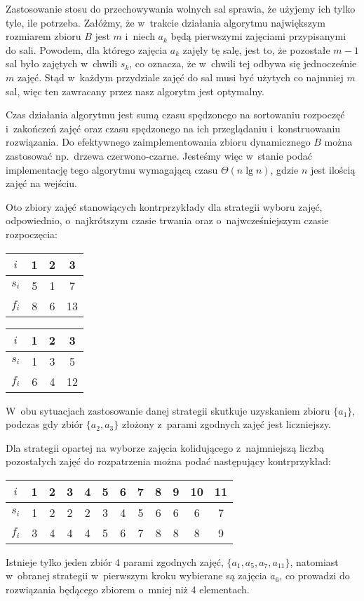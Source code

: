 Zastosowanie stosu do przechowywania wolnych sal sprawia, że użyjemy ich tylko tyle, ile potrzeba.
Załóżmy, że w~trakcie działania algorytmu największym rozmiarem zbioru $B$ jest $m$ i~niech $a_k$ będą pierwszymi zajęciami przypisanymi do  sali.
Powodem, dla którego zajęcia $a_k$ zajęły tę salę, jest to, że pozostałe $m-1$ sal było zajętych w~chwili $s_k$, co oznacza, że w~chwili tej odbywa się jednocześnie $m$ zajęć.
Stąd w~każdym przydziale zajęć do sal musi być użytych co najmniej $m$ sal, więc ten zawracany przez nasz algorytm jest optymalny.

Czas działania algorytmu jest sumą czasu spędzonego na sortowaniu rozpoczęć i~zakończeń zajęć oraz czasu spędzonego na ich przeglądaniu i~konstruowaniu rozwiązania.
Do efektywnego zaimplementowania zbioru dynamicznego $B$ można zastosować np.\ drzewa czerwono-czarne.
Jesteśmy więc w~stanie podać implementację tego algorytmu wymagającą czasu $\Theta(n\lg n)$, gdzie $n$ jest ilością zajęć na wejściu.

\exercise %

\noindent Oto zbiory zajęć stanowiących kontrprzykłady dla strategii wyboru zajęć, odpowiednio, o~najkrótszym czasie trwania oraz o~najwcześniejszym czasie rozpoczęcia:
\begin{center}
	\begin{tabular}{cccc}
		$i$ & 1 & 2 & 3 \\ \hline
		$s_i$ & 5 & 1 & 7 \\
		$f_i$ & 8 & 6 & 13
	\end{tabular}
	\hskip3cm
	\begin{tabular}{cccc}
		$i$ & 1 & 2 & 3 \\ \hline
		$s_i$ & 1 & 3 & 5 \\
		$f_i$ & 6 & 4 & 12
	\end{tabular}
\end{center}
W~obu sytuacjach zastosowanie danej strategii skutkuje uzyskaniem zbioru $\{a_1\}$, podczas gdy zbiór $\{a_2,a_3\}$ złożony z~parami zgodnych zajęć jest liczniejszy.

Dla strategii opartej na wyborze zajęcia kolidującego z~najmniejszą liczbą pozostałych zajęć do rozpatrzenia można podać następujący kontrprzykład:
\begin{center}
	\begin{tabular}{cccccccccccc}
		$i$ & 1 & 2 & 3 & 4 & 5 & 6 & 7 & 8 & 9 & 10 & 11 \\ \hline
		$s_i$ & 1 & 2 & 2 & 2 & 3 & 4 & 5 & 6 & 6 & 6 & 7 \\
		$f_i$ & 3 & 4 & 4 & 4 & 5 & 6 & 7 & 8 & 8 & 8 & 9
	\end{tabular}
\end{center}
Istnieje tylko jeden zbiór 4 parami zgodnych zajęć, $\{a_1,a_5,a_7,a_{11}\}$, natomiast w~obranej strategii w~pierwszym kroku wybierane są zajęcia $a_6$, co prowadzi do rozwiązania będącego zbiorem o~mniej niż 4 elementach.
